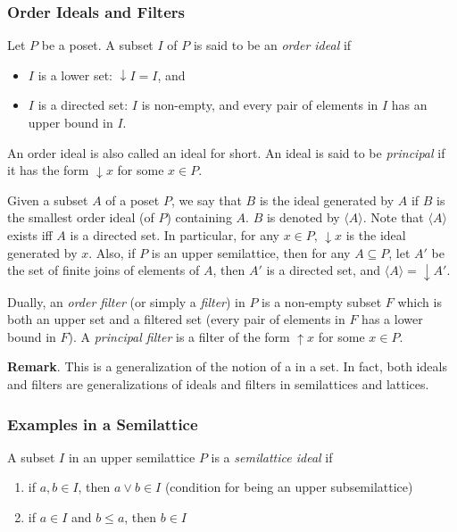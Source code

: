 \documentclass[12pt]{article}
\newcommand{\up}{\uparrow\!\!}
\newcommand{\down}{\downarrow\!\!}
\begin{document}
\subsubsection*{Order Ideals and Filters}

Let $P$ be a poset.  A subset $I$ of $P$ is said to be an \emph{order ideal} if 
\begin{itemize}
\item $I$ is a lower set: $\down I=I$, and
\item $I$ is a directed set: $I$ is non-empty, and every pair of elements in $I$ has an upper bound in $I$.
\end{itemize}
An order ideal is also called an ideal for short.  An ideal is said to be \emph{principal} if it has the form $\down x$ for some $x\in P$.

Given a subset $A$ of a poset $P$, we say that $B$ is the ideal generated by $A$ if $B$ is the smallest order ideal (of $P$) containing $A$.  $B$ is denoted by $\langle A\rangle$.  Note that $\langle A\rangle$ exists iff $A$ is a directed set.  In particular, for any $x\in P$, $\down x$ is the ideal generated by $x$.  Also, if $P$ is an upper semilattice, then for any $A\subseteq P$, let $A'$ be the set of finite joins of elements of $A$, then $A'$ is a directed set, and $\langle A\rangle=\down A'$.

Dually, an \emph{order filter} (or simply a \emph{filter}) in $P$ is a non-empty subset $F$ which is both an upper set and a filtered set (every pair of elements in $F$ has a lower bound in $F$).  A \emph{principal filter} is a filter of the form $\up x$ for some $x\in P$.

\textbf{Remark}.
This is a generalization of the notion of a  in a set.  In fact, both ideals and filters are generalizations of ideals and filters in semilattices and lattices.  

\subsubsection*{Examples in a Semilattice}

A subset $I$ in an upper semilattice $P$ is a \emph{semilattice ideal} if 
\begin{enumerate}
\item
if $a,b\in I$, then $a\vee b\in I$ (condition for being an upper subsemilattice)
\item
if $a\in I$ and $b\le a$, then $b\in I$
\end{enumerate}
\end{document}
